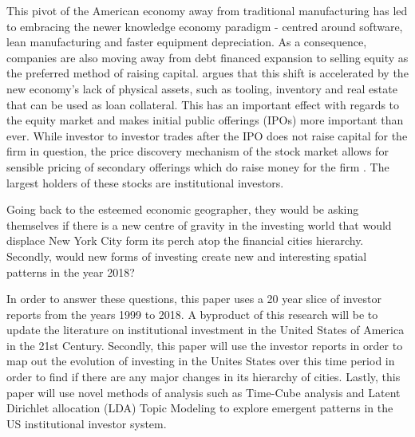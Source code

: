 This pivot of the American economy away from traditional manufacturing has led to embracing the newer knowledge economy paradigm - centred around software, lean manufacturing and faster equipment depreciation.  As a consequence, companies are also moving away from debt financed expansion to selling equity as the preferred method of raising capital. 	\cite{Graves2003} argues that this shift is accelerated by the new economy's lack of physical assets, such as tooling, inventory and real estate that can be used as loan collateral. This has an important effect with regards to the equity market and makes initial public offerings (IPOs) more important than ever. While investor to investor trades after the IPO does not raise capital for the firm in question, the price discovery mechanism of the stock market allows for sensible pricing of secondary offerings which do raise money for the firm \citep{Tobin1969}. The largest holders of these stocks are institutional investors.

Going back to the esteemed economic geographer, they would be asking themselves if there is a new centre of gravity in the investing world that would displace New York City form its perch atop the financial cities hierarchy.  Secondly, would new forms of investing create new and interesting spatial patterns in the year 2018?  

In order to answer these questions, this paper uses a 20 year slice of investor reports from the years 1999 to 2018.  A byproduct of this research will be to update the literature on institutional investment in the United States of America in the 21st Century.  Secondly, this paper will use the investor reports in order to map out the evolution of investing in the Unites States over this time period in order to find if there are any major changes in its hierarchy of cities.  Lastly, this paper will use novel methods of analysis such as Time-Cube analysis and Latent Dirichlet allocation (LDA) Topic Modeling to explore emergent patterns in the US institutional investor system.  

